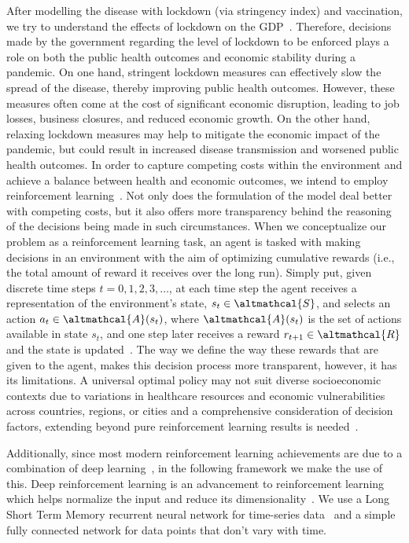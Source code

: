 \documentclass[tikz,fleqn,12pt]{wlscirep}
\begin{document}
After modelling the disease with lockdown (via stringency index) and vaccination, we try to understand the effects of lockdown on the GDP~\cite{StringencyEconomicDecline,Cilloni2020,Arinaminpathy2010}. Therefore, decisions made by the government regarding the level of lockdown to be enforced plays a role on both the public health outcomes and economic stability during a pandemic. On one hand, stringent lockdown measures can effectively slow the spread of the disease, thereby improving public health outcomes. However, these measures often come at the cost of significant economic disruption, leading to job losses, business closures, and reduced economic growth. On the other hand, relaxing lockdown measures may help to mitigate the economic impact of the pandemic, but could result in increased disease transmission and worsened public health outcomes. In order to capture competing costs within the environment and achieve a balance between health and economic outcomes, we intend to employ reinforcement learning~\cite{Nguyen2022,Bastani2021,Song2022,Ohi2020,PADMANABHAN2021102676}. Not only does the formulation of the model deal better with competing costs, but it also offers more transparency behind the reasoning of the decisions being made in such circumstances. When we conceptualize our problem as a reinforcement learning task, an agent is tasked with making decisions in an environment with the aim of optimizing cumulative rewards (i.e., the total amount of reward it receives over the long run). Simply put, given discrete time steps $t = 0, 1, 2, 3, \dots$, at each time step the agent receives a representation of the environment's state, $s_t \in \altmathcal{S}$, and selects an action $a_t \in \altmathcal{A}(s_t)$, where $\altmathcal{A}(s_t)$ is the set of actions available in state $s_t$, and one step later receives a reward $r_{t+1} \in \altmathcal{R}$ and the state is updated~\cite{sutton2018reinforcement}. The way we define the way these rewards that are given to the agent, makes this decision process more transparent, however, it has its limitations. A universal optimal policy may not suit diverse socioeconomic contexts due to variations in healthcare resources and economic vulnerabilities across countries, regions, or cities and a comprehensive consideration of decision factors, extending beyond pure reinforcement learning results is needed~\cite{Song2022,Dunn2017,Demir2006}.

Additionally, since most modern reinforcement learning achievements are due to a combination of deep learning~\cite{Mnih2015}, in the following framework we make the use of this. Deep reinforcement learning is an advancement to reinforcement learning which helps normalize the input and reduce its dimensionality~\cite{Lavet2018,Arulkumaran2017,Henderson_Islam_Bachman_Pineau_Precup_Meger_2018,Mnih2015}. We use a Long Short Term Memory recurrent neural network for time-series data~\cite{NIPS2001_a38b1617,LSTM} and a simple fully connected network for data points that don't vary with time.
\end{document}
